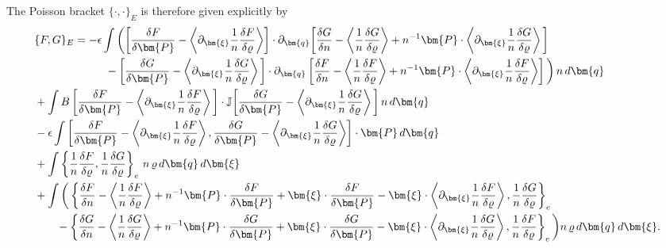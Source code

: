 \documentclass[%
 aip,
 amsmath,amssymb,
reprint, onecolumn %
]{revtex4-1}
\begin{document}
The Poisson bracket $\{\cdot,\cdot\}_E$ is therefore given explicitly by
\begin{align}
&\{F,G\}_{E} = -\epsilon\int \bigg(\bigg[\frac{\delta F}{\delta\bm{P}} - \bigg\langle\partial_{\bm{\xi}}\frac{1}{n}\frac{\delta F}{\delta\varrho}\bigg\rangle\bigg]\cdot\partial_{\bm{q}}\bigg[\frac{\delta G}{\delta n} - \left\langle \frac{1}{n}\frac{\delta G}{\delta\varrho}\right\rangle + n^{-1}\bm{P}\cdot\left\langle\partial_{\bm{\xi}}\frac{1}{n}\frac{\delta G}{\delta\varrho}\right\rangle\bigg]\nonumber\\
%
&\quad\quad\quad\qquad\quad\hspace*{.25em}\, - \bigg[\frac{\delta G}{\delta\bm{P}} - \left\langle\partial_{\bm{\xi}}\frac{1}{n}\frac{\delta G}{\delta\varrho}\right\rangle\bigg]\cdot\partial_{\bm{q}}\left[\frac{\delta F}{\delta n} - \left\langle \frac{1}{n}\frac{\delta F}{\delta\varrho}\right\rangle + n^{-1}\bm{P}\cdot\left\langle\partial_{\bm{\xi}}\frac{1}{n}\frac{\delta F}{\delta\varrho}\right\rangle\right] \bigg) \,n\,d\bm{q}\nonumber\\
&+\int B\,\bigg[\frac{\delta F}{\delta\bm{P}} - \left\langle\partial_{\bm{\xi}}\frac{1}{n}\frac{\delta F}{\delta\varrho}\right\rangle\bigg]\cdot \mathbb{J}\bigg[\frac{\delta G}{\delta\bm{P}} - \left\langle\partial_{\bm{\xi}}\frac{1}{n}\frac{\delta G}{\delta\varrho}\right\rangle\bigg]\,n\,d\bm{q}\nonumber\\
& -\epsilon\int\left[\frac{\delta F}{\delta\bm{P}} - \left\langle\partial_{\bm{\xi}}\frac{1}{n}\frac{\delta F}{\delta\varrho}\right\rangle,\frac{\delta G}{\delta\bm{P}} - \left\langle\partial_{\bm{\xi}}\frac{1}{n}\frac{\delta G}{\delta\varrho}\right\rangle\right]\cdot\bm{P}\,d\bm{q}\nonumber\\
& + \int \left\{\frac{1}{n}\frac{\delta F}{\delta \varrho},\frac{1}{n}\frac{\delta G}{\delta \varrho}\right\}_e \,n\,\varrho\,d\bm{q}\,d\bm{\xi}\nonumber\\
&+\int\bigg(\left\{\frac{\delta F}{\delta n} - \left\langle \frac{1}{n}\frac{\delta F}{\delta\varrho}\right\rangle + n^{-1}\bm{P}\cdot\frac{\delta F}{\delta \bm{P}} + \bm{\xi}\cdot\frac{\delta F}{\delta\bm{P}} - \bm{\xi}\cdot\left\langle\partial_{\bm{\xi}}\frac{1}{n}\frac{\delta F}{\delta\varrho}\right\rangle,\frac{1}{n}\frac{\delta G}{\delta \varrho}\right\}_e\nonumber\\
%
&\qquad-\left\{\frac{\delta G}{\delta n} - \left\langle \frac{1}{n}\frac{\delta G}{\delta\varrho}\right\rangle + n^{-1}\bm{P}\cdot\frac{\delta G}{\delta \bm{P}} + \bm{\xi}\cdot\frac{\delta G}{\delta\bm{P}} - \bm{\xi}\cdot\left\langle\partial_{\bm{\xi}}\frac{1}{n}\frac{\delta G}{\delta\varrho}\right\rangle,\frac{1}{n}\frac{\delta F}{\delta \varrho}\right\}_e\bigg)n\,\varrho\,d\bm{q}\,d\bm{\xi}.
\end{align}
\end{document}
